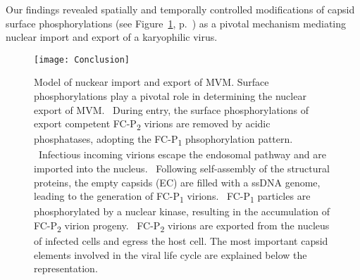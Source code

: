 \par
\medskip
Our findings revealed spatially and temporally controlled modifications of capsid surface phosphorylations (see Figure~\ref{Scheme}, p.~\pageref{Scheme}) as a pivotal mechanism mediating nuclear import and export of a karyophilic virus. 






\begin{figure}[H]
\centering
  \texttt{[image: Conclusion]}
\vspace{5pt}
  \caption[Model of nuclear import and export of MVM.]
   {Model of nuckear import and export of MVM. Surface phosphorylations play a pivotal role in determining the nuclear export of MVM. \textbf{}~During entry, the surface phosphorylations of export competent FC-P\textsubscript{2} virions are removed by acidic phosphatases, adopting the FC-P\textsubscript{1} phsophorylation pattern. \textbf{}~Infectious incoming virions escape the endosomal pathway and are imported into the nucleus. \textbf{}~Following self-assembly of the structural proteins, the empty capsids (EC) are filled with a ssDNA genome, leading to the generation of FC-P\textsubscript{1} virions. \textbf{}~FC-P\textsubscript{1} particles are phosphorylated by a nuclear kinase, resulting in the accumulation of FC-P\textsubscript{2} virion progeny. \textbf{}~FC-P\textsubscript{2} virions are exported from the nucleus of infected cells and egress the host cell. The most important capsid elements involved in the viral life cycle are explained below the representation.} 
\label{Scheme}
\end{figure}















